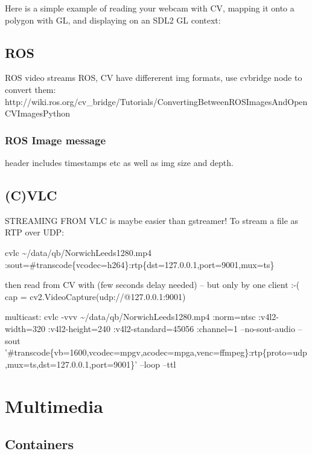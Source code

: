 \documentclass[oneside,english]{scrbook}
\begin{document}
Here is a simple example of reading your webcam with CV, mapping it onto a polygon with GL, and displaying on an SDL2 GL context:




\chapter{ROS}

ROS video streams ROS, CV have differerent img formats, use cvbridge
node to convert them: http://wiki.ros.org/cv\_bridge/Tutorials/ConvertingBetweenROSImagesAndOpenCVImagesPython

\section{ROS Image message}

header includes timestamps etc as well as img size and depth.



\chapter{(C)VLC}

STREAMING FROM VLC is maybe easier than gstreamer! To stream a file
as RTP over UDP:

cvlc \textasciitilde{}/data/qb/NorwichLeeds1280.mp4 :sout=\#transcode\{vcodec=h264\}:\textquotedbl{}rtp\{dst=127.0.0.1,port=9001,mux=ts\}\textquotedbl{}

then read from CV with (few seconds delay needed) -- but only by one
client :-( cap = cv2.VideoCapture(\textquotedbl{}udp://@127.0.0.1:9001\textquotedbl{})

multicast: cvlc -vvv \textasciitilde{}/data/qb/NorwichLeeds1280.mp4
:norm=ntsc :v4l2-width=320 :v4l2-height=240 :v4l2-standard=45056 :channel=1
--no-sout-audio --sout '\#transcode\{vb=\textquotedbl{}1600\textquotedbl{},vcodec=mpgv,acodec=mpga,venc=ffmpeg\}:rtp\{proto=udp,mux=ts,dst=127.0.0.1,port=9001\}'
--loop --ttl 



\part{Multimedia}


\chapter{Containers}
\end{document}
